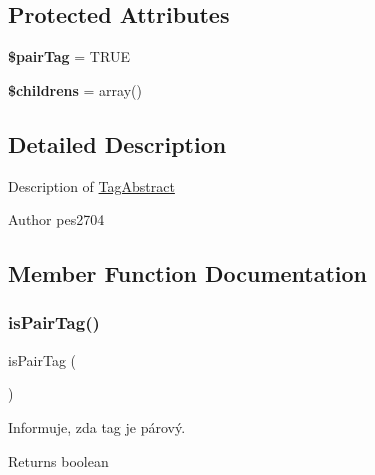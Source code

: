 \subsection*{Protected Attributes}
\begin{DoxyCompactItemize}
\item 
\mbox{\label{class_pes_1_1_dom_1_1_node_1_1_tag_1_1_tag_abstract_a07db761a6ce4cd77ae522269096a377f}} 
{\bfseries \$pair\+Tag} = T\+R\+UE
\item 
\mbox{\label{class_pes_1_1_dom_1_1_node_1_1_tag_1_1_tag_abstract_ac732f5640006b77455042dc58d95a68b}} 
{\bfseries \$childrens} = array()
\end{DoxyCompactItemize}


\subsection{Detailed Description}
Description of \mbox{\hyperlink{class_pes_1_1_dom_1_1_node_1_1_tag_1_1_tag_abstract}{Tag\+Abstract}} \begin{DoxyAuthor}{Author}
pes2704 
\end{DoxyAuthor}


\subsection{Member Function Documentation}
\mbox{\label{class_pes_1_1_dom_1_1_node_1_1_tag_1_1_tag_abstract_a8d496f376687a9da8397563a92d43918}} 
\subsubsection{\texorpdfstring{is\+Pair\+Tag()}{isPairTag()}}
{\footnotesize\ttfamily is\+Pair\+Tag (\begin{DoxyParamCaption}{ }\end{DoxyParamCaption})}

Informuje, zda tag je párový. \begin{DoxyReturn}{Returns}
boolean 
\end{DoxyReturn}


